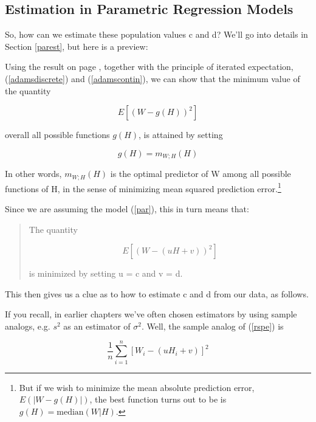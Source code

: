 \subsection{Estimation in Parametric Regression Models}

So, how can we estimate these population values c and d?  We'll go into
details in Section \ref{parest}, but here is a preview:

\label{optimpred}
Using the result on page \pageref{mingcpage}, together with the
principle of iterated expectation, (\ref{adamsdiscrete}) and
(\ref{adamscontin}), we can show that the minimum value of the quantity

\begin{equation}
E \left [ \left ( W - g(H) \right )^2 \right ]
\end{equation}

overall all possible functions $g(H)$, is attained by setting

\begin{equation}
g(H) = m_{W;H}(H)
\end{equation}

In other words, $m_{W;H}(H)$ is the optimal predictor of W among all
possible functions of H, in the sense of minimizing mean squared
prediction error.\footnote{But if we wish to minimize the mean absolute
prediction error, $E \left ( | W - g(H) | \right )$, the best function
turns out to be is $g(H) = \textrm{median}(W|H)$.}  

Since we are assuming the model (\ref{par}), this in turn means that:

\begin{quote}

The quantity 

\begin{equation}
\label{rspe}
E \left [ \left ( W - (uH+v) \right )^2 \right ]
\end{equation}

is minimized by setting u = c and v = d.  

\end{quote}

This then gives us a clue as to how to estimate c and d from our data,
as follows.

If you recall, in earlier chapters we've often chosen estimators by
using sample analogs, e.g.  $s^2$ as an estimator of $\sigma^2$.  Well,
the sample analog of (\ref{rspe}) is

\begin{equation}
\label{srspe}
\frac{1}{n} \sum_{i=1}^n \left [ W_i - (uH_i + v) \right ]^2
\end{equation}

